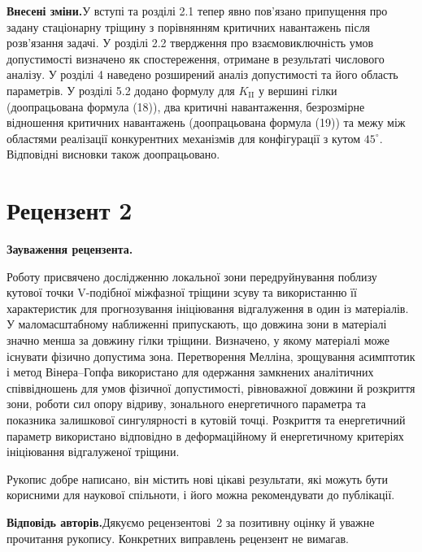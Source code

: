 \documentclass[11pt]{article}
\newcommand{\responseheading}{\textbf{Відповідь авторів.}\enspace}
\newcommand{\revisionheading}{\textbf{Внесені зміни.}\enspace}
\newenvironment{reviewcomment}{\def\FrameCommand{\textcolor{blue!45!black}{\vrule width 1.2pt}\hspace{9pt}}\MakeFramed{\advance\hsize-\width\FrameRestore}\noindent\textbf{Зауваження рецензента.}\par\smallskip\noindent}{\endMakeFramed}
\begin{document}
\revisionheading У вступі та розділі 2.1 тепер явно пов’язано припущення про задану стаціонарну тріщину з порівнянням критичних навантажень після розв’язання задачі. У розділі 2.2 твердження про взаємовиключність умов допустимості визначено як спостереження, отримане в результаті числового аналізу. У розділі 4 наведено розширений аналіз допустимості та його область параметрів. У розділі 5.2 додано формулу для \(K_{\mathrm{II}}\) у вершині гілки (доопрацьована формула (18)), два критичні навантаження, безрозмірне відношення критичних навантажень (доопрацьована формула (19)) та межу між областями реалізації конкурентних механізмів для конфігурації з кутом \(45^\circ\). Відповідні висновки також доопрацьовано.

\section*{Рецензент 2}

\begin{reviewcomment}
Роботу присвячено дослідженню локальної зони передруйнування поблизу кутової точки V-подібної міжфазної тріщини зсуву та використанню її характеристик для прогнозування ініціювання відгалуження в один із матеріалів. У маломасштабному наближенні припускають, що довжина зони в матеріалі значно менша за довжину гілки тріщини. Визначено, у якому матеріалі може існувати фізично допустима зона. Перетворення Мелліна, зрощування асимптотик і метод Вінера--Гопфа використано для одержання замкнених аналітичних співвідношень для умов фізичної допустимості, рівноважної довжини й розкриття зони, роботи сил опору відриву, зонального енергетичного параметра та показника залишкової сингулярності в кутовій точці. Розкриття та енергетичний параметр використано відповідно в деформаційному й енергетичному критеріях ініціювання відгалуженої тріщини.

Рукопис добре написано, він містить нові цікаві результати, які можуть бути корисними для наукової спільноти, і його можна рекомендувати до публікації.
\end{reviewcomment}

\responseheading Дякуємо рецензентові~2 за позитивну оцінку й уважне прочитання рукопису. Конкретних виправлень рецензент не вимагав.
\end{document}
